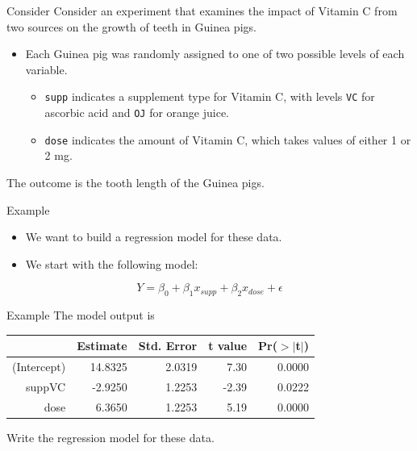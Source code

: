 
\begin{frame}{Consider}
    Consider an experiment that examines the impact of Vitamin C from two sources on the growth of teeth in Guinea pigs.
    \begin{itemize}
        \item Each Guinea pig was randomly assigned to one of two possible levels of each variable.
        \begin{itemize}
            \item \texttt{supp} indicates a supplement type for Vitamin C, with levels \texttt{VC} for ascorbic acid and \texttt{OJ} for orange juice.
            \item \texttt{dose} indicates the amount of Vitamin C, which takes values of either 1 or 2 mg.
        \end{itemize}
    \end{itemize}
The outcome is the tooth length of the Guinea pigs.
\end{frame}

\begin{frame}{Example}
    \begin{itemize}
        \item We want to build a regression model for these data.
        \item We start with the following model:
    \end{itemize}
    \[
        Y = \beta_0 + \beta_1 x_{supp} + \beta_2 x_{dose} + \epsilon
    \]
\end{frame}

\begin{frame}{Example}
    The model output is
    \begin{table}[h]
    \begin{tabular}{r rrrr}
        \hline
         & Estimate & Std. Error & t value & Pr($>|$t$|$) \\
        \hline
        (Intercept) & 14.8325 & 2.0319 & 7.30 & 0.0000 \\
        suppVC & -2.9250 & 1.2253 & -2.39 & 0.0222 \\
        dose & 6.3650 & 1.2253 & 5.19 & 0.0000 \\ 
        \hline
    \end{tabular}
    \end{table}
    Write the regression model for these data.
\end{frame}

